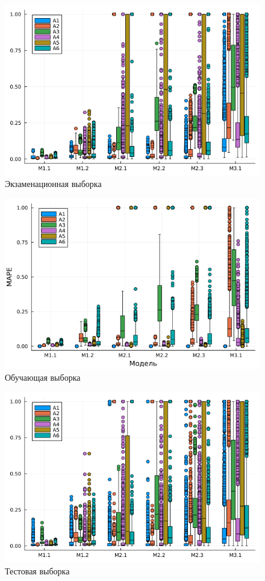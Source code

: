 \documentclass[14pt]{article}
\begin{document}
\begin{figure}
	\centering
	\includegraphics[width=0.9\linewidth]{pic/box_plot_all}
	\caption{Экзаменационная выборка}
	\label{fig:boxplotall}
\end{figure}
\begin{figure}
	\centering
	\includegraphics[width=0.9\linewidth]{pic/box_plot_train}
	\caption{Обучающая выборка}
	\label{fig:boxplottrain}
\end{figure}
\begin{figure}
	\centering
	\includegraphics[width=0.9\linewidth]{pic/box_plot_test}
	\caption{Тестовая выборка}
	\label{fig:boxplottest}
\end{figure}
\end{document}
